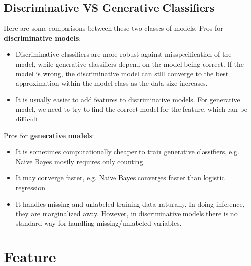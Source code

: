 \documentclass{article}
\begin{document}
   \subsection{Discriminative VS Generative Classifiers}
   Here are some comparisons between these two classes of models. Pros for \textbf{discriminative models}:
   \begin{itemize}
   \item Discriminative classifiers are more robust against misspecification of the model, while generative classifiers depend on the model being correct. If the model is wrong, the discriminative model can still converge to the best approximation within the model class as the data size increases.
   \item It is usually easier to add features to discriminative models. For generative model, we need to try to find the correct model for the feature, which can be difficult.
   \end{itemize}
   Pros for \textbf{generative models}:
   \begin{itemize}
   \item It is sometimes computationally cheaper to train generative classifiers, e.g. Naive Bayes mostly requires only counting.
   \item It may converge faster, e.g. Naive Bayes converges faster than logistic regression.
   \item It handles missing and unlabeled training data naturally. In doing inference, they are marginalized away. However, in discriminative models there is no standard way for handling missing/unlabeled variables.
   \end{itemize}
   
   \section{Feature}
\end{document}
